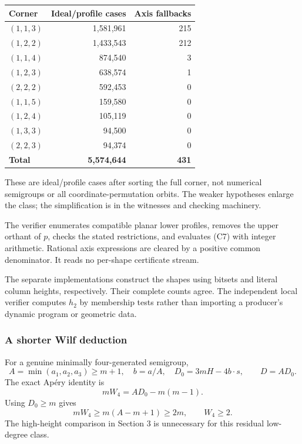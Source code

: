 \documentclass[
  11pt,
  a4paper,
]{article}
\begin{document}
\begin{longtable}[]{@{}lrr@{}}
\toprule\noalign{}
Corner & Ideal/profile cases & Axis fallbacks \\
\midrule\noalign{}
\endhead
\bottomrule\noalign{}
\endlastfoot
\((1,1,3)\) & 1,581,961 & 215 \\
\((1,2,2)\) & 1,433,543 & 212 \\
\((1,1,4)\) & 874,540 & 3 \\
\((1,2,3)\) & 638,574 & 1 \\
\((2,2,2)\) & 592,453 & 0 \\
\((1,1,5)\) & 159,580 & 0 \\
\((1,2,4)\) & 105,119 & 0 \\
\((1,3,3)\) & 94,500 & 0 \\
\((2,2,3)\) & 94,374 & 0 \\
\textbf{Total} & \textbf{5,574,644} & \textbf{431} \\
\end{longtable}

These are ideal/profile cases after sorting the full corner, not
numerical semigroups or all coordinate-permutation orbits. The weaker
hypotheses enlarge the class; the simplification is in the witnesses and
checking machinery.

The verifier enumerates compatible planar lower profiles, removes the
upper orthant of \(p\), checks the stated restrictions, and evaluates
(C7) with integer arithmetic. Rational axis expressions are cleared by a
positive common denominator. It reads no per-shape certificate stream.

The separate implementations construct the shapes using bitsets and
literal column heights, respectively. Their complete counts agree. The
independent local verifier computes \(h_2\) by membership tests rather
than importing a producer's dynamic program or geometric data.

\hypertarget{a-shorter-wilf-deduction}{%
\subsubsection{A shorter Wilf
deduction}\label{a-shorter-wilf-deduction}}

For a genuine minimally four-generated semigroup, \[
A=\min(a_1,a_2,a_3)\ge m+1,\quad b=a/A,\quad
D_0=3mH-4b\cdot s,\qquad D=AD_0.
\] The exact Apéry identity is \[
mW_4=AD_0-m(m-1).
\] Using \(D_0\ge m\) gives \[
mW_4\ge m(A-m+1)\ge2m,
\qquad\boxed{W_4\ge2.}
\tag{C8}
\] The high-height comparison in Section 3 is unnecessary for this
residual low-degree class.
\end{document}
